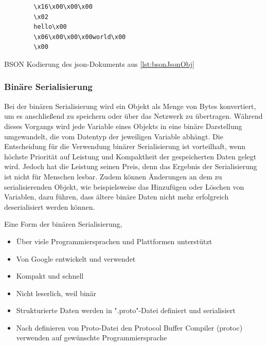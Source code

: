 \begin{listing}[htp]
    \begin{verbatim} 
        \x16\x00\x00\x00           
        \x02                      
        hello\x00                  
        \x06\x00\x00\x00world\x00  
        \x00                       
    \end{verbatim}
    \caption{BSON Kodierung des \ac{json}-Dokuments aus \ref{lst:bsonJsonObj} \cite{mongodbJSONBSON}}
    \label{lst:bsonExp}
\end{listing}

\subsubsection{Binäre Serialisierung}
Bei der binären Serialisierung wird ein Objekt als Menge von Bytes konvertiert, um es anschließend zu speichern oder über das Netzwerk zu übertragen. Während dieses Vorgangs wird jede Variable eines Objekts in eine binäre Darstellung umgewandelt, die vom Datentyp der jeweiligen Variable abhängt. Die Entscheidung für die Verwendung binärer Serialisierung ist vorteilhaft, wenn höchste Priorität auf Leistung und Kompaktheit der gespeicherten Daten gelegt wird. Jedoch hat die Leistung seinen Preis, denn das Ergebnis der Serialisierung ist nicht für Menschen lesbar. Zudem können Änderungen an dem zu serialisierenden Objekt, wie beispielsweise das Hinzufügen oder Löschen von Variablen, dazu führen, dass ältere binäre Daten nicht mehr erfolgreich deserialisiert werden können.\cite{microsoftBinarySerialization}\cite{programmathicallyUnderstandingBinary}

Eine Form der binären Serialisierung, 
\cite{currier2022protocol}\cite{protobufLanguageGuide}\cite{protobufProtocolBufferJava}

\begin{itemize}
    \item Über viele Programmiersprachen und Plattformen unterstützt
    \item Von Google entwickelt und verwendet
    \item Kompakt und schnell
    \item Nicht leserlich, weil binär
    \item Strukturierte Daten werden in ".proto"-Datei definiert und serialisiert
    \item Nach definieren von Proto-Datei den Protocol Buffer Compiler (protoc) verwenden auf gewünschte Programmiersprache
\end{itemize}


